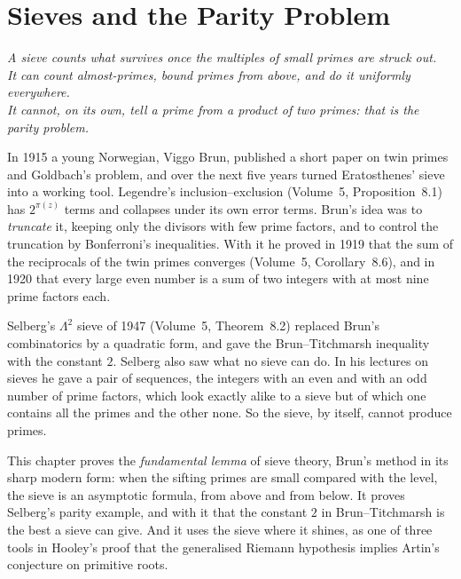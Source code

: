 \chapter{Sieves and the Parity Problem}
\begin{center}\itshape
A sieve counts what survives once the multiples of small primes are struck out.\\
It can count almost-primes, bound primes from above, and do it uniformly everywhere.\\
It cannot, on its own, tell a prime from a product of two primes: that is the parity problem.
\end{center}

In 1915 a young Norwegian, Viggo Brun, published a short paper on twin primes and Goldbach's problem, and over the next five years turned Eratosthenes' sieve into a working tool. Legendre's inclusion--exclusion (Volume~5, Proposition~8.1) has $2^{\pi(z)}$ terms and collapses under its own error terms. Brun's idea was to \emph{truncate} it, keeping only the divisors with few prime factors, and to control the truncation by Bonferroni's inequalities. With it he proved in 1919 that the sum of the reciprocals of the twin primes converges (Volume~5, Corollary~8.6), and in 1920 that every large even number is a sum of two integers with at most nine prime factors each.

Selberg's $\Lambda^2$ sieve of 1947 (Volume~5, Theorem~8.2) replaced Brun's combinatorics by a quadratic form, and gave the Brun--Titchmarsh inequality with the constant $2$. Selberg also saw what no sieve can do. In his lectures on sieves he gave a pair of sequences, the integers with an even and with an odd number of prime factors, which look exactly alike to a sieve but of which one contains all the primes and the other none. So the sieve, by itself, cannot produce primes.

This chapter proves the \emph{fundamental lemma} of sieve theory, Brun's method in its sharp modern form: when the sifting primes are small compared with the level, the sieve is an asymptotic formula, from above and from below. It proves Selberg's parity example, and with it that the constant $2$ in Brun--Titchmarsh is the best a sieve can give. And it uses the sieve where it shines, as one of three tools in Hooley's proof that the generalised Riemann hypothesis implies Artin's conjecture on primitive roots.

